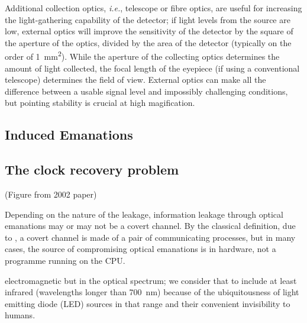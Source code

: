 \documentclass[a4paper,twoside,11pt]{book}
\begin{document}
Additional collection optics, {\it i.e.}, telescope or fibre optics, are useful
for increasing the light-gathering capability of the detector; if light levels
from the source are low, external optics will improve the sensitivity of the
detector by the square of the aperture of the optics, divided by the area of
the detector (typically on the order of \SI{1}{\square\milli\metre}). While the
aperture of the collecting optics determines the amount of light collected, the
focal length of the eyepiece (if using a conventional telescope) determines the
field of view. External optics can make all the difference between a usable
signal level and impossibly challenging conditions, but pointing stability is
crucial at high magification.

\subsection{Induced Emanations}

\label{section:injection_attacks}

\subsection{The clock recovery problem}

(Figure from 2002 paper)

Depending on the nature of the leakage, information leakage through optical
emanations may or may not be a covert channel. By the classical definition,
due to \cite{Lampson1973}, a covert channel is made of a pair of communicating
processes, but in many cases, the source of compromising optical emanations
is in hardware, not a programme running on the CPU.

electromagnetic but in the optical spectrum; we consider that to include at
least infrared (wavelengths longer than \SI{700}{\nano\metre}) because of the
ubiquitousness of light emitting diode (LED) sources in that range and their
convenient invisibility to humans.

\end{document}

